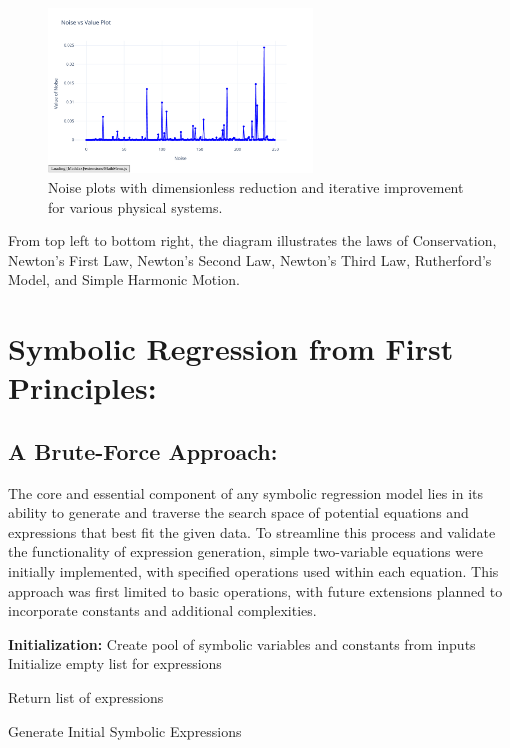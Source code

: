 \documentclass{article}
\begin{document}
\begin{figure}[H]
    \includegraphics[width=7cm]{noise_Simple_Harmonic_Motion_d_i}
    \caption{Noise plots with dimensionless reduction and iterative improvement for various physical systems.}
    \label{fig:noise_dimless_iterative_plots}
\end{figure}

From top left to bottom right, the diagram illustrates the laws of Conservation, Newton's First Law, Newton's Second Law, Newton's Third Law, Rutherford's Model, and Simple Harmonic Motion.\\




\section{Symbolic Regression from First Principles: }


\subsection{A Brute-Force Approach: }

The core and essential component of any symbolic regression model lies in its ability to generate and traverse the search space of potential equations and expressions that best fit the given data. To streamline this process and validate the functionality of expression generation, simple two-variable equations were initially implemented, with specified operations used within each equation. This approach was first limited to basic operations, with future extensions planned to incorporate constants and additional complexities.\\



\begin{algorithm}[H]
\SetAlgoLined
{}

\textbf{Initialization:}\;
Create pool of symbolic variables and constants from inputs\;
Initialize empty list for expressions\;


Return list of expressions\;

\caption{Generate Initial Symbolic Expressions}
\label{alg:generate_expressions} %
\end{algorithm}\\
\end{document}
